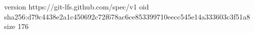 version https://git-lfs.github.com/spec/v1
oid sha256:d79c4438e2a1c450692c72f678ac6ce853399710eecc545e14a333603c3f51a8
size 176
